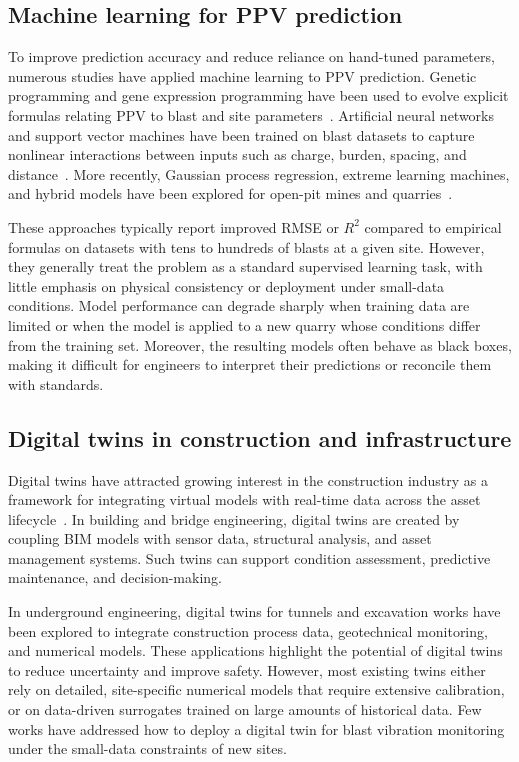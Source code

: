 \documentclass[a4paper,fleqn]{cas-sc}
\begin{document}
\subsection{Machine learning for PPV prediction}

To improve prediction accuracy and reduce reliance on hand-tuned parameters,
numerous studies have applied machine learning to PPV prediction.
Genetic programming and gene expression programming have been used to evolve explicit formulas
relating PPV to blast and site parameters~\citep{Dindarloo2015GP,Faradonbeh2017Hybrid}.
Artificial neural networks and support vector machines have been trained on blast datasets
to capture nonlinear interactions between inputs such as charge, burden, spacing, and distance~\citep{Mohammadnejad2012SVM}.
More recently, Gaussian process regression, extreme learning machines, and hybrid models
have been explored for open-pit mines and quarries~\citep{Arthur2022GPR,Keshtegar2023RSMSVR,Nguyen2019EvoPPV}.

These approaches typically report improved RMSE or $R^2$ compared to empirical formulas
on datasets with tens to hundreds of blasts at a given site.
However, they generally treat the problem as a standard supervised learning task,
with little emphasis on physical consistency or deployment under small-data conditions.
Model performance can degrade sharply when training data are limited
or when the model is applied to a new quarry whose conditions differ from the training set.
Moreover, the resulting models often behave as black boxes,
making it difficult for engineers to interpret their predictions or reconcile them with standards.

\subsection{Digital twins in construction and infrastructure}

Digital twins have attracted growing interest in the construction industry
as a framework for integrating virtual models with real-time data across the asset lifecycle~\citep{Boje2020SemanticDT,Cao2021DTIntelligentConstruction,Tita2023BridgeDTBIM}.
In building and bridge engineering, digital twins are created by coupling BIM models with sensor data,
structural analysis, and asset management systems.
Such twins can support condition assessment, predictive maintenance, and decision-making.

In underground engineering, digital twins for tunnels and excavation works
have been explored to integrate construction process data,
geotechnical monitoring, and numerical models.
These applications highlight the potential of digital twins
to reduce uncertainty and improve safety.
However, most existing twins either rely on detailed, site-specific numerical models that require extensive calibration,
or on data-driven surrogates trained on large amounts of historical data.
Few works have addressed how to deploy a digital twin for blast vibration monitoring
under the small-data constraints of new sites.
\end{document}
